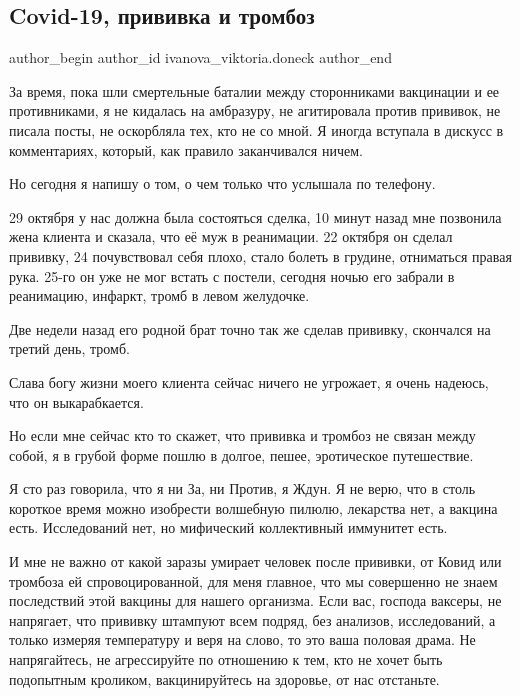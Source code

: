  
 
 
 
 
 
\subsection{Covid-19, прививка и тромбоз}
\label{sec:26_10_2021.fb.ivanova_viktoria.doneck.1.covid_privivka_tromboz}
 
\ifcmt
 author_begin
   author_id ivanova_viktoria.doneck
 author_end
\fi

За время, пока шли смертельные баталии между сторонниками вакцинации и ее
противниками, я не кидалась на амбразуру, не агитировала против прививок, не
писала посты, не оскорбляла тех, кто не со мной. Я иногда вступала в дискусс в
комментариях, который, как правило заканчивался ничем. 

Но сегодня я напишу о том, о чем только что услышала по телефону. 

29 октября у нас должна была состояться сделка, 10 минут назад мне позвонила
жена клиента и сказала, что её муж в реанимации. 22 октября он сделал прививку,
24 почувствовал себя плохо, стало болеть в грудине, отниматься правая рука.
25-го он уже не мог встать с постели, сегодня ночью его забрали в реанимацию,
инфаркт, тромб в левом желудочке. 

Две недели назад его родной брат точно так же сделав прививку, скончался на
третий день, тромб. 

Слава богу жизни моего клиента сейчас ничего не угрожает, я очень надеюсь, что
он выкарабкается. 

Но если мне сейчас кто то скажет, что прививка и тромбоз не связан между собой,
я в грубой форме пошлю в долгое, пешее, эротическое путешествие. 

Я сто раз говорила, что я ни За, ни Против, я Ждун. Я не верю, что в столь
короткое время можно изобрести волшебную пилюлю, лекарства нет, а вакцина есть.
Исследований нет, но мифический коллективный иммунитет есть. 

И мне не важно от какой заразы умирает человек после прививки, от Ковид или
тромбоза ей спровоцированной, для меня главное, что мы совершенно не знаем
последствий этой вакцины для нашего организма. Если вас, господа ваксеры, не
напрягает, что прививку штампуют всем подряд, без анализов, исследований, а
только измеряя температуру и веря на слово, то это ваша половая драма. Не
напрягайтесь, не агрессируйте по отношению к тем, кто не хочет быть подопытным
кроликом, вакцинируйтесь на здоровье, от нас отстаньте.


